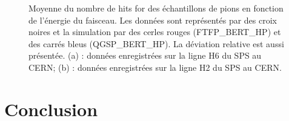 \begin{figure}[!ht]
  \caption{Moyenne du nombre de hits for des échantillons de pions en fonction de l'énergie du faisceau. Les données sont représentés par des croix noires et la simulation par des cerles rouges (FTFP\_BERT\_HP) et des carrés bleus (QGSP\_BERT\_HP). La déviation relative est aussi présentée. (a) : données enregistrées sur la ligne H6 du SPS au CERN; (b) : données enregistrées sur la ligne H2 du SPS au CERN.}
  \label{fig.nhit_pi-_ebeam}
\end{figure}


\section{Conclusion}
